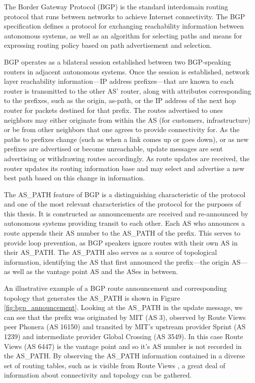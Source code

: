 The Border Gateway Protocol (BGP) is the standard interdomain routing protocol
that runs between networks to achieve Internet connectivity. The BGP
specification defines a protocol for exchanging reachability information
between autonomous systems, as well as an algorithm for selecting paths and
means for expressing routing policy based on path advertisement and selection.

BGP operates as a bilateral session established between two BGP-speaking
routers in adjacent autonomous systems. Once the session is established,
network layer reachability information---IP address prefixes---that are known
to each router is transmitted to the other AS' router, along with attributes
corresponding to the prefixes, such as the origin, as-path, or the IP address
of the next hop router for packets destined for that prefix. The routes
advertised to ones neighbors may either originate from within the AS (for
customers, infrastructure) or be from  other neighbors that one agrees to
provide connectivity for. As the paths to prefixes change (such as when a link
comes up or goes down), or as new prefixes are advertised or become
unreachable, update messages are sent advertising or withdrawing routes
accordingly. As route updates are received, the router updates its routing
information base and may select and advertise a new best path based on this
change in information.

The AS\_PATH feature of BGP is a distinguishing characteristic of the protocol
and one of the most relevant characteristics of the protocol for the purposes
of this thesis. It is constructed as announcements are received and
re-announced by autonomous systems providing transit to each other. Each AS who
announces a route appends their AS number to the AS\_PATH of the prefix. This
serves to provide loop prevention, as BGP speakers ignore routes with their own
AS in their AS\_PATH. The AS\_PATH also serves as a source of topological
information, identifying the AS that first announced the prefix---the origin
AS---as well as the vantage point AS and the ASes in between.

An illustrative example of a BGP route announcement and corresponding topology
that generates the AS\_PATH is shown in Figure \ref{fig:bgp_announcement}.
Looking at the AS\_PATH in the update message, we can see that the prefix was
originated by MIT (AS 3), observed by Route Views peer Phonera (AS 16150) and
transited by MIT's upstream provider Sprint (AS 1239) and intermediate provider
Global Crossing (AS 3549). In this case Route Views (AS 6447) is the vantage
point and so it's AS number is not recorded in the AS\_PATH. By observing the
AS\_PATH information contained in a diverse set of routing tables, such as is
visible from Route Views \cite{Routeviews}, a great deal of information about
connectivity and topology can be gathered.

